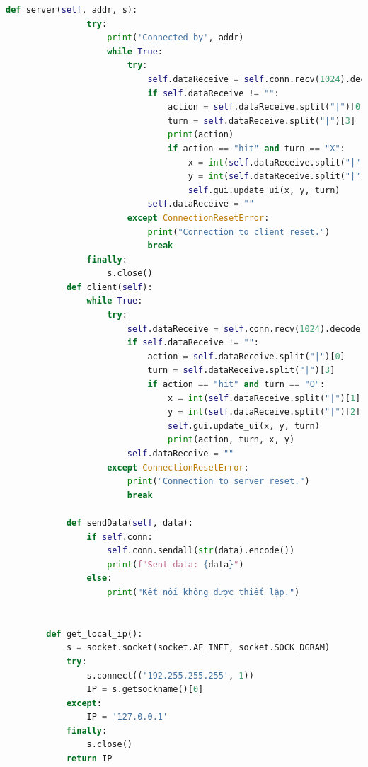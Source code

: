 \documentclass[a4paper]{article}
\begin{document}
\begin{lstlisting}[language=Python]
            def server(self, addr, s):
                try:
                    print('Connected by', addr)
                    while True:
                        try:
                            self.dataReceive = self.conn.recv(1024).decode()
                            if self.dataReceive != "":
                                action = self.dataReceive.split("|")[0]
                                turn = self.dataReceive.split("|")[3]
                                print(action)
                                if action == "hit" and turn == "X":
                                    x = int(self.dataReceive.split("|")[1])
                                    y = int(self.dataReceive.split("|")[2])
                                    self.gui.update_ui(x, y, turn)
                            self.dataReceive = ""
                        except ConnectionResetError:
                            print("Connection to client reset.")
                            break
                finally:
                    s.close()
            def client(self):
                while True:
                    try:
                        self.dataReceive = self.conn.recv(1024).decode()  
                        if self.dataReceive != "":
                            action = self.dataReceive.split("|")[0]
                            turn = self.dataReceive.split("|")[3]
                            if action == "hit" and turn == "O":
                                x = int(self.dataReceive.split("|")[1])
                                y = int(self.dataReceive.split("|")[2])
                                self.gui.update_ui(x, y, turn)
                                print(action, turn, x, y)
                        self.dataReceive = ""
                    except ConnectionResetError:
                        print("Connection to server reset.")
                        break
        
            def sendData(self, data):
                if self.conn:
                    self.conn.sendall(str(data).encode())
                    print(f"Sent data: {data}")
                else:
                    print("Kết nối không được thiết lập.")
        
        
        def get_local_ip():
            s = socket.socket(socket.AF_INET, socket.SOCK_DGRAM)
            try:
                s.connect(('192.255.255.255', 1))
                IP = s.getsockname()[0]
            except:
                IP = '127.0.0.1'
            finally:
                s.close()
            return IP
        
    \end{lstlisting}
\newpage
\end{document}
